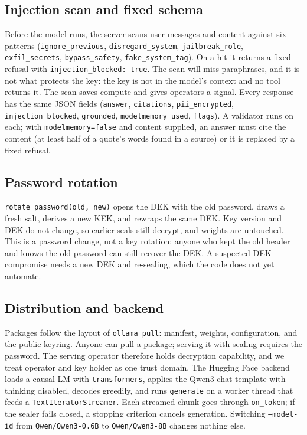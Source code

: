 \documentclass[conference,compsoc]{IEEEtran}
\newcommand{\code}[1]{\texttt{#1}}
\begin{document}
\subsection{Injection scan and fixed schema}
\label{sec:injection}

Before the model runs, the server scans user messages and content against six patterns (\code{ignore\_previous}, \code{disregard\_system}, \code{jailbreak\_role}, \code{exfil\_secrets}, \code{bypass\_safety}, \code{fake\_system\_tag}). On a hit it returns a fixed refusal with \code{injection\_blocked: true}. The scan will miss paraphrases, and it is not what protects the key: the key is not in the model's context and no tool returns it. The scan saves compute and gives operators a signal. Every response has the same JSON fields (\code{answer}, \code{citations}, \code{pii\_encrypted}, \code{injection\_blocked}, \code{grounded}, \code{modelmemory\_used}, \code{flags}). A validator runs on each; with \code{modelmemory=false} and content supplied, an answer must cite the content (at least half of a quote's words found in a source) or it is replaced by a fixed refusal.

\subsection{Password rotation}
\label{sec:rotation}

\code{rotate\_password(old, new)} opens the DEK with the old password, draws a fresh salt, derives a new KEK, and rewraps the same DEK. Key version and DEK do not change, so earlier seals still decrypt, and weights are untouched. This is a password change, not a key rotation: anyone who kept the old header and knows the old password can still recover the DEK. A suspected DEK compromise needs a new DEK and re-sealing, which the code does not yet automate.

\subsection{Distribution and backend}
\label{sec:backend}

Packages follow the layout of \code{ollama pull}: manifest, weights, configuration, and the public keyring. Anyone can pull a package; serving it with sealing requires the password. The serving operator therefore holds decryption capability, and we treat operator and key holder as one trust domain. The Hugging Face backend loads a causal LM with \code{transformers}, applies the Qwen3 chat template with thinking disabled, decodes greedily, and runs \code{generate} on a worker thread that feeds a \code{TextIteratorStreamer}. Each streamed chunk goes through \code{on\_token}; if the sealer fails closed, a stopping criterion cancels generation. Switching \code{--model-id} from \code{Qwen/Qwen3-0.6B} to \code{Qwen/Qwen3-8B} changes nothing else.
\end{document}
